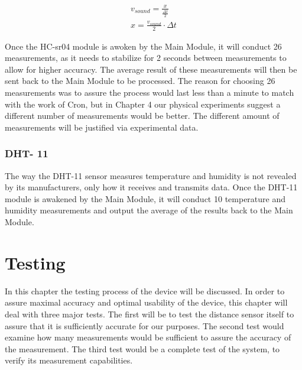 \documentclass[twoside]{ctuthesis}
\theoremstyle{plain}
\theoremstyle{definition}
\theoremstyle{note}
\begin{document}
\begin{gather} \nonumber
v_{sound} = \frac{x}{\frac{\Delta t}{2}}\\
x = \frac{v_{sound}}{2}\cdot \Delta t
\end{gather}

Once the HC-sr04 module is awoken by the Main Module, it will conduct 26 measurements, as it needs to stabilize for 2 seconds between measurements to allow for higher accuracy. The average result of these measurements will then be sent back to the Main Module to be processed. The reason for choosing 26 measurements was to assure the process would last less than a minute to match with the work of Cron, but in Chapter 4 our physical experiments suggest a different number of measurements would be better. The different amount of measurements will be justified via experimental data.


\subsection{DHT- 11}
The way the DHT-11 sensor measures temperature and humidity is not revealed by its manufacturers, only how it receives and transmits data. Once the DHT-11 module is awakened by the Main Module, it will conduct 10 temperature and humidity measurements and output the average of the results back to the Main Module.

\newpage

\pagebreak 

\begingroup
\renewcommand{\cleardoublepage}{}
\renewcommand{\clearpage}{}
\chapter{Testing}
\endgroup
In this chapter the testing process of the device will be discussed. In order to assure maximal accuracy and optimal usability of the device, this chapter will deal with three major tests. The first will be to test the distance sensor itself to assure that it is sufficiently accurate for our purposes. The second test would examine how many measurements would be sufficient to assure the accuracy of the measurement. The third test would be a complete test of the system, to verify its measurement capabilities.
\end{document}
